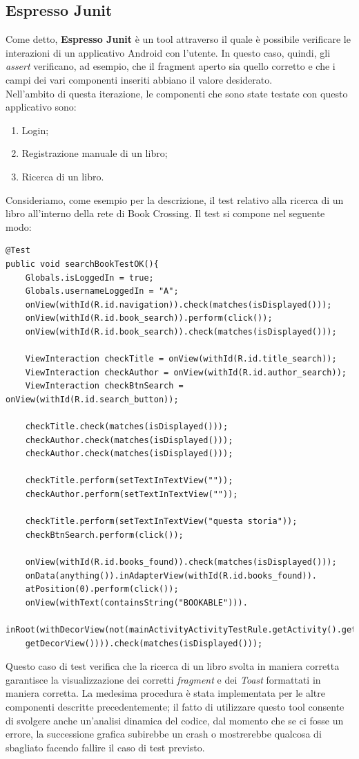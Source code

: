 \subsection{Espresso Junit}
Come detto, \textbf{Espresso Junit} è un tool attraverso il quale è possibile verificare le interazioni di un applicativo Android con l'utente. In questo caso, quindi, gli \textit{assert} verificano, ad esempio, che il fragment aperto sia quello corretto e che i campi dei vari componenti inseriti abbiano il valore desiderato.
\\ \noindent
Nell'ambito di questa iterazione, le componenti che sono state testate con questo applicativo sono:
\begin{enumerate}
	\item Login;
	\item Registrazione manuale di un libro;
	\item Ricerca di un libro.
\end{enumerate}
\noindent 
Consideriamo, come esempio per la descrizione, il test relativo alla ricerca di un libro all'interno della rete di Book Crossing. Il test si compone nel seguente modo:
\begin{lstlisting}
@Test
public void searchBookTestOK(){
	Globals.isLoggedIn = true;
	Globals.usernameLoggedIn = "A";
	onView(withId(R.id.navigation)).check(matches(isDisplayed()));
	onView(withId(R.id.book_search)).perform(click());
	onView(withId(R.id.book_search)).check(matches(isDisplayed()));
	
	ViewInteraction checkTitle = onView(withId(R.id.title_search));
	ViewInteraction checkAuthor = onView(withId(R.id.author_search));
	ViewInteraction checkBtnSearch = onView(withId(R.id.search_button));
	
	checkTitle.check(matches(isDisplayed()));
	checkAuthor.check(matches(isDisplayed()));
	checkAuthor.check(matches(isDisplayed()));
	
	checkTitle.perform(setTextInTextView(""));
	checkAuthor.perform(setTextInTextView(""));
	
	checkTitle.perform(setTextInTextView("questa storia"));
	checkBtnSearch.perform(click());
	
	onView(withId(R.id.books_found)).check(matches(isDisplayed()));
	onData(anything()).inAdapterView(withId(R.id.books_found)).
	atPosition(0).perform(click());
	onView(withText(containsString("BOOKABLE"))).
	inRoot(withDecorView(not(mainActivityActivityTestRule.getActivity().getWindow().
	getDecorView()))).check(matches(isDisplayed()));
\end{lstlisting}
\noindent Questo caso di test verifica che la ricerca di un libro svolta in maniera corretta garantisce la visualizzazione dei corretti \textit{fragment} e dei \textit{Toast} formattati in maniera corretta.
La medesima procedura è stata implementata per le altre componenti descritte precedentemente; il fatto di utilizzare questo tool consente di svolgere anche un'analisi dinamica del codice, dal momento che se ci fosse un errore, la successione grafica subirebbe un crash o mostrerebbe qualcosa di sbagliato facendo fallire il caso di test previsto.

